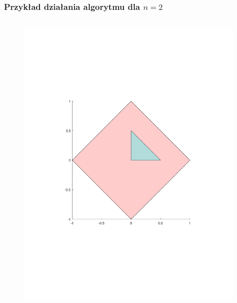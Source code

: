 \documentclass[9pt]{beamer}
\begin{document}
\begin{frame}
	\frametitle{Przykład działania algorytmu dla $n = 2$}
	\vspace{-1.5cm}
	\begin{columns}[T, onlytextwidth] %
		\begin{column}{0.5\textwidth} %
			\begin{figure}
				\centering
				\includegraphics[width=\linewidth]{part1.pdf}
			\end{figure}
		\end{column}
		

\end{columns}
\end{frame}
\end{document}
